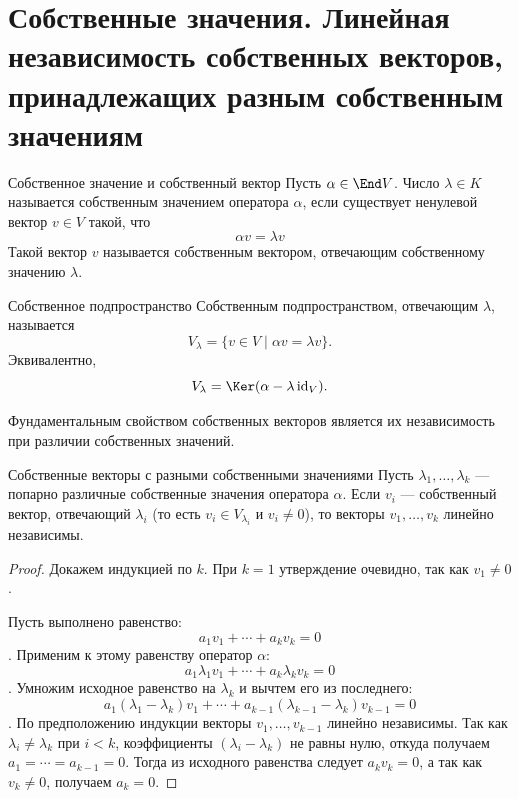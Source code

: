 
\section{Собственные значения. Линейная независимость собственных векторов, принадлежащих разным собственным значениям}

\begin{Definition}{Собственное значение и собственный вектор}{}
	Пусть $\alpha\in\End V$. Число $\lambda\in K$ называется собственным значением оператора $\alpha$, если существует ненулевой вектор $v\in V$ такой, что
	\[
	\alpha v=\lambda v
	\]
	Такой вектор $v$ называется собственным вектором, отвечающим собственному значению $\lambda$.
\end{Definition}

\begin{Definition}{Собственное подпространство}{}
	Собственным подпространством, отвечающим $\lambda$, называется
	\[
	V_\lambda=\{v\in V\mid \alpha v=\lambda v\}.
	\]
	Эквивалентно,
	\[
	V_\lambda=\Ker(\alpha-\lambda\operatorname{id}_V).
	\]
\end{Definition}

Фундаментальным свойством собственных векторов является их независимость при различии собственных значений.

\begin{Theorem}{Собственные векторы с разными собственными значениями}{}
	Пусть $\lambda_1,\ldots,\lambda_k$ --- попарно различные собственные значения оператора $\alpha$. Если $v_i$ --- собственный вектор, отвечающий $\lambda_i$ (то есть $v_i\in V_{\lambda_i}$ и $v_i\ne 0$), то векторы $v_1,\ldots,v_k$ линейно независимы.
\end{Theorem}

\begin{proof}
	Докажем индукцией по $k$. При $k=1$ утверждение очевидно, так как $v_1\ne 0$.

	Пусть выполнено равенство:
	\[
	a_1v_1+\cdots+a_kv_k=0
	\].
	Применим к этому равенству оператор $\alpha$:
	\[
	a_1\lambda_1v_1+\cdots+a_k\lambda_kv_k=0
	\].
	Умножим исходное равенство на $\lambda_k$ и вычтем его из последнего:
	\[
	a_1(\lambda_1-\lambda_k)v_1+\cdots+ a_{k-1}(\lambda_{k-1}-\lambda_k)v_{k-1}=0
	\].
	По предположению индукции векторы $v_1,\ldots,v_{k-1}$ линейно независимы. Так как $\lambda_i\ne\lambda_k$ при $i<k$, коэффициенты $(\lambda_i-\lambda_k)$ не равны нулю, откуда получаем $a_1=\cdots=a_{k-1}=0$. Тогда из исходного равенства следует $a_kv_k=0$, а так как $v_k \ne 0$, получаем $a_k=0$.
\end{proof}

